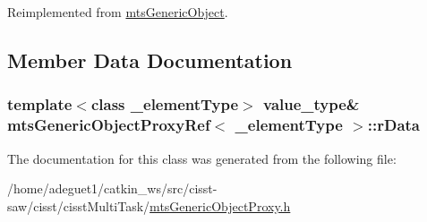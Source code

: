 Reimplemented from \hyperlink{classmts_generic_object_a4916a6c62ee5b167d7c93c88ab72523a}{mts\-Generic\-Object}.



\subsection{Member Data Documentation}
\hypertarget{classmts_generic_object_proxy_ref_a588d268b7943faf5949bc201e5ef502a}{
\subsubsection[{r\-Data}]{\setlength{\rightskip}{0pt plus 5cm}template$<$class \-\_\-element\-Type$>$ {\bf value\-\_\-type}\& {\bf mts\-Generic\-Object\-Proxy\-Ref}$<$ \-\_\-element\-Type $>$\-::r\-Data}}\label{classmts_generic_object_proxy_ref_a588d268b7943faf5949bc201e5ef502a}


The documentation for this class was generated from the following file\-:\begin{DoxyCompactItemize}
\item 
/home/adeguet1/catkin\-\_\-ws/src/cisst-\/saw/cisst/cisst\-Multi\-Task/\hyperlink{mts_generic_object_proxy_8h}{mts\-Generic\-Object\-Proxy.\-h}\end{DoxyCompactItemize}
